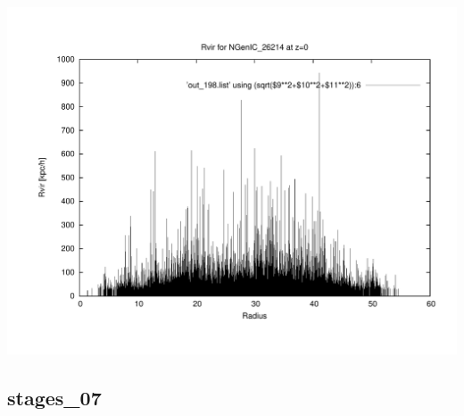 \includegraphics[scale=0.3]{NGenIC_26214/plot_rvir_z0.pdf}

% 
%
%
%
%
%
%
%

\newpage
\subsection{stages\_07}

